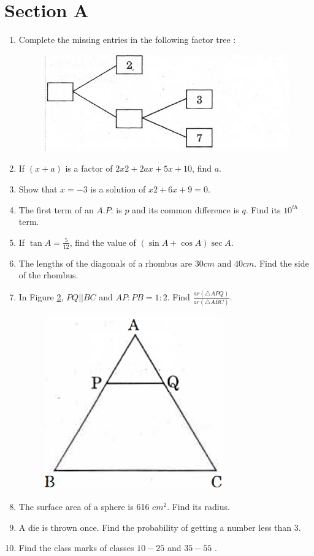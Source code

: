 \documentclass[journal,12pt,twocolumn]{IEEEtran}
\renewcommand\thesection{\arabic{section}}
\begin{document}
\section{Section A}
\renewcommand{\theequation}{\theenumi}
\begin{enumerate}[label=\thesection.\arabic*.,ref=\thesection.\theenumi]
\item Complete the missing entries in the following factor tree :\\
\begin{figure}[h!]
    \centering
    \includegraphics[width=0.5\columnwidth,center]{./fig/1.png}
	\caption{}
	\label{fig1}
 \end{figure}
\item If $(x+a)$ is a factor of $2x2+2ax+5x+10$, find $a$.\\
\item  Show that $x=-3$ is a solution of $x2+6x+9=0$.\\
\item The first term of an $A.P$. is $p$ and its common difference is $q$. Find its $10^{th}$ term. \\
\item If $\tan A=\frac{5}{12}$, find the value of $(\sin A+\cos A)\sec A$. \\
\item The lengths of the diagonals of a rhombus are $30 cm$ and $40 cm$. Find the side of the rhombus. \\
\item In Figure \ref{fig2}, $PQ||BC$ and $AP:PB=1:2$. Find $\frac{ar(\triangle APQ)}{ar(\triangle ABC)}$.\\
\begin{figure}[h!]
	\centering
    \includegraphics[width=0.5\columnwidth,center]{./fig/2.png}
    \caption{}
    \label{fig2}
\end{figure}
\item The surface area of a sphere is 616 $cm^2$. Find its radius.\\
\item A die is thrown once. Find the probability of getting a number less than $3$.\\  
\item Find the class marks of classes $10 -25$ and $35 -55$ . \\
\end{enumerate}
\end{document}
